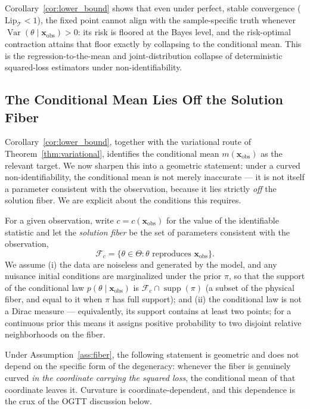 Corollary~\ref{cor:lower_bound} shows that even under perfect, stable convergence ($\mathrm{Lip}_\mathcal{T}<1$), the fixed point cannot align with the sample-specific truth whenever $\operatorname{Var}(\theta \mid \mathbf{x}_\mathrm{obs}) > 0$: its risk is floored at the Bayes level, and the risk-optimal contraction attains that floor exactly by collapsing to the conditional mean. This is the regression-to-the-mean and joint-distribution collapse of deterministic squared-loss estimators under non-identifiability.

\subsection{The Conditional Mean Lies Off the Solution Fiber}
\label{subsec:off_fiber}

Corollary~\ref{cor:lower_bound}, together with the variational route of Theorem~\ref{thm:variational}, identifies the conditional mean $m(\mathbf{x}_\mathrm{obs})$ as the relevant target. We now sharpen this into a geometric statement: under a curved non-identifiability, the conditional mean is not merely inaccurate --- it is not itself a parameter consistent with the observation, because it lies strictly \emph{off} the solution fiber. We are explicit about the conditions this requires.

\begin{assumption}
\label{ass:fiber}
For a given observation, write $c=c(\mathbf{x}_\mathrm{obs})$ for the value of the identifiable statistic and let the \emph{solution fiber} be the set of parameters consistent with the observation,
\[
\mathcal{F}_c = \{\theta \in \Theta : \theta \text{ reproduces } \mathbf{x}_\mathrm{obs}\}.
\]
We assume (i) the data are noiseless and generated by the model, and any nuisance initial conditions are marginalized under the prior $\pi$, so that the support of the conditional law $p(\theta \mid \mathbf{x}_\mathrm{obs})$ is $\mathcal{F}_c\cap\operatorname{supp}(\pi)$ (a subset of the physical fiber, and equal to it when $\pi$ has full support); and (ii) the conditional law is not a Dirac measure --- equivalently, its support contains at least two points; for a continuous prior this means it assigns positive probability to two disjoint relative neighborhoods on the fiber.
\end{assumption}

Under Assumption~\ref{ass:fiber}, the following statement is geometric and does not depend on the specific form of the degeneracy: whenever the fiber is genuinely curved \emph{in the coordinate carrying the squared loss}, the conditional mean of that coordinate leaves it. Curvature is coordinate-dependent, and this dependence is the crux of the OGTT discussion below.

